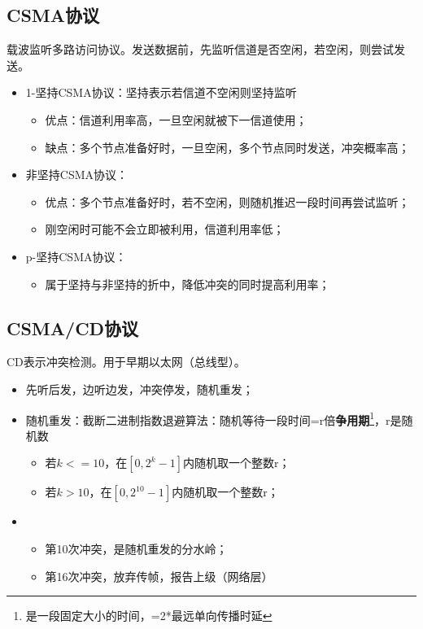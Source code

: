 \subsection{CSMA协议}
载波监听多路访问协议。发送数据前，先监听信道是否空闲，若空闲，则尝试发送。
\begin{itemize}
    \item 1-坚持CSMA协议：坚持表示若信道不空闲则坚持监听\begin{itemize}
        \item 优点：信道利用率高，一旦空闲就被下一信道使用；
        \item 缺点：多个节点准备好时，一旦空闲，多个节点同时发送，冲突概率高；
    \end{itemize}
    \item 非坚持CSMA协议：\begin{itemize}
        \item 优点：多个节点准备好时，若不空闲，则随机推迟一段时间再尝试监听；
        \item 刚空闲时可能不会立即被利用，信道利用率低；
    \end{itemize}
    \item p-坚持CSMA协议：\begin{itemize}
        \item 属于坚持与非坚持的折中，降低冲突的同时提高利用率；
    \end{itemize}
\end{itemize}


\subsection{CSMA/CD协议}
CD表示冲突检测。用于早期以太网（总线型）。

\begin{itemize}
    \item 先听后发，边听边发，冲突停发，随机重发；
    \item 随机重发：截断二进制指数退避算法：随机等待一段时间=r倍\textbf{争用期}\footnote{是一段固定大小的时间，=2*最远单向传播时延}，r是随机数\begin{itemize}
        \item 若\(k <= 10\)，在\([0, 2^k - 1]\)内随机取一个整数r；
        \item 若\(k > 10\)，在\([0, 2^{10} - 1]\)内随机取一个整数r；
    \end{itemize}
    \item \begin{itemize}
        \item 第10次冲突，是随机重发的分水岭；
        \item 第16次冲突，放弃传帧，报告上级（网络层）
    \end{itemize}
\end{itemize}

